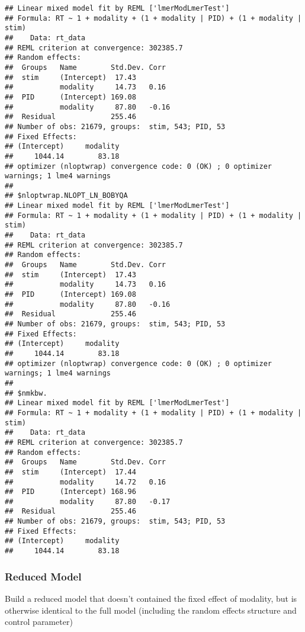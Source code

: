 \documentclass[
]{article}
\begin{document}
\begin{verbatim}
## Linear mixed model fit by REML ['lmerModLmerTest']
## Formula: RT ~ 1 + modality + (1 + modality | PID) + (1 + modality | stim)
##    Data: rt_data
## REML criterion at convergence: 302385.7
## Random effects:
##  Groups   Name        Std.Dev. Corr 
##  stim     (Intercept)  17.43        
##           modality     14.73   0.16 
##  PID      (Intercept) 169.08        
##           modality     87.80   -0.16
##  Residual             255.46        
## Number of obs: 21679, groups:  stim, 543; PID, 53
## Fixed Effects:
## (Intercept)     modality  
##     1044.14        83.18  
## optimizer (nloptwrap) convergence code: 0 (OK) ; 0 optimizer warnings; 1 lme4 warnings 
## 
## $nloptwrap.NLOPT_LN_BOBYQA
## Linear mixed model fit by REML ['lmerModLmerTest']
## Formula: RT ~ 1 + modality + (1 + modality | PID) + (1 + modality | stim)
##    Data: rt_data
## REML criterion at convergence: 302385.7
## Random effects:
##  Groups   Name        Std.Dev. Corr 
##  stim     (Intercept)  17.43        
##           modality     14.73   0.16 
##  PID      (Intercept) 169.08        
##           modality     87.80   -0.16
##  Residual             255.46        
## Number of obs: 21679, groups:  stim, 543; PID, 53
## Fixed Effects:
## (Intercept)     modality  
##     1044.14        83.18  
## optimizer (nloptwrap) convergence code: 0 (OK) ; 0 optimizer warnings; 1 lme4 warnings 
## 
## $nmkbw.
## Linear mixed model fit by REML ['lmerModLmerTest']
## Formula: RT ~ 1 + modality + (1 + modality | PID) + (1 + modality | stim)
##    Data: rt_data
## REML criterion at convergence: 302385.7
## Random effects:
##  Groups   Name        Std.Dev. Corr 
##  stim     (Intercept)  17.44        
##           modality     14.72   0.16 
##  PID      (Intercept) 168.96        
##           modality     87.80   -0.17
##  Residual             255.46        
## Number of obs: 21679, groups:  stim, 543; PID, 53
## Fixed Effects:
## (Intercept)     modality  
##     1044.14        83.18
\end{verbatim}

\hypertarget{reduced-model}{%
\subsubsection{Reduced Model}\label{reduced-model}}

Build a reduced model that doesn't contained the fixed effect of
modality, but is otherwise identical to the full model (including the
random effects structure and control parameter)
\end{document}
